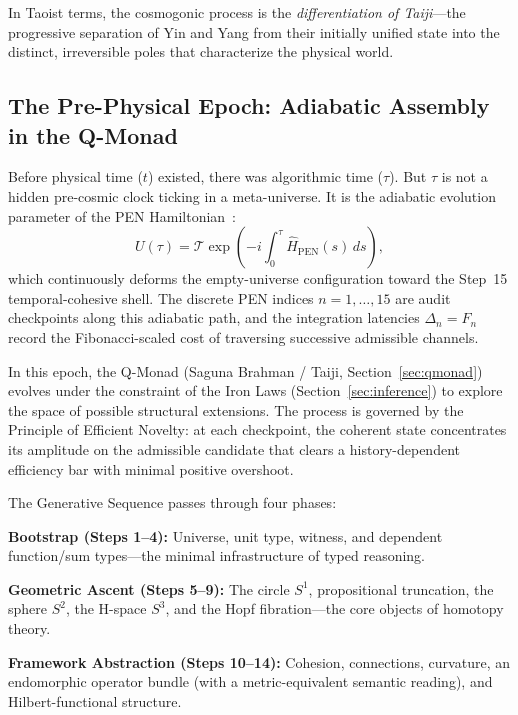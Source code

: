 \documentclass[12pt,a4paper]{article}
\begin{document}
In Taoist terms, the cosmogonic process is the \emph{differentiation of Taiji}---the progressive separation of Yin and Yang from their initially unified state into the distinct, irreversible poles that characterize the physical world.


\subsection{The Pre-Physical Epoch: Adiabatic Assembly in the Q-Monad}
\label{sec:prephysical}

Before physical time ($t$) existed, there was algorithmic time ($\tau$). But $\tau$ is not a hidden pre-cosmic clock ticking in a meta-universe. It is the adiabatic evolution parameter of the PEN Hamiltonian~\cite{pen2}:
\begin{equation}
U(\tau) = \mathcal{T} \exp\left( -i \int_0^\tau \hat{H}_{\mathrm{PEN}}(s)\,ds \right),
\label{eq:hamiltonian}
\end{equation}
which continuously deforms the empty-universe configuration toward the Step~15 temporal-cohesive shell. The discrete PEN indices $n = 1, \ldots, 15$ are audit checkpoints along this adiabatic path, and the integration latencies $\Delta_n = F_n$ record the Fibonacci-scaled cost of traversing successive admissible channels.

In this epoch, the Q-Monad (Saguna Brahman / Taiji, Section~\ref{sec:qmonad}) evolves under the constraint of the Iron Laws (Section~\ref{sec:inference}) to explore the space of possible structural extensions. The process is governed by the Principle of Efficient Novelty: at each checkpoint, the coherent state concentrates its amplitude on the admissible candidate that clears a history-dependent efficiency bar with minimal positive overshoot.

The Generative Sequence passes through four phases:

\textbf{Bootstrap (Steps 1--4):} Universe, unit type, witness, and dependent function/sum types---the minimal infrastructure of typed reasoning.

\textbf{Geometric Ascent (Steps 5--9):} The circle $S^1$, propositional truncation, the sphere $S^2$, the H-space $S^3$, and the Hopf fibration---the core objects of homotopy theory.

\textbf{Framework Abstraction (Steps 10--14):} Cohesion, connections, curvature, an endomorphic operator bundle (with a metric-equivalent semantic reading), and Hilbert-functional structure.
\end{document}
